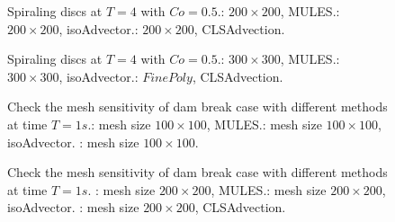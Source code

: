 \begin{figure}[htbp]
\centering
{}
\caption{Spiraling discs at $T=4$ with $Co=0.5$.: $200\times{200}$, MULES.: $200\times{200}$, isoAdvector.: $200\times{200}$, CLSAdvection.}
\label{fig:SpiralingdiscTri2}
\end{figure}
\begin{figure}[htbp]
\centering
{}
\caption{Spiraling discs at $T=4$ with $Co=0.5$.: $300\times{300}$, MULES.: $300\times{300}$, isoAdvector.: $FinePoly$, CLSAdvection.}
\label{fig:SpiralingdiscTri3}
\end{figure}
\begin{figure}[htbp]
\centering
{}
\caption{Check the mesh sensitivity of dam break case with different methods at time $T =1s$.: mesh size $100\times{100}$, MULES.: mesh size $100\times{100}$, isoAdvector. : mesh size $100\times{100}$.}
\label{fig:DamBreakMeshSensitivity1}
\end{figure}
\begin{figure}[htbp]
\centering
{}
\caption{Check the mesh sensitivity of dam break case with different methods at time $T =1s$. : mesh size $200\times{200}$, MULES.: mesh size $200\times{200}$, isoAdvector. : mesh size $200\times{200}$, CLSAdvection.}
\label{fig:DamBreakMeshSensitivity2}
\end{figure}
